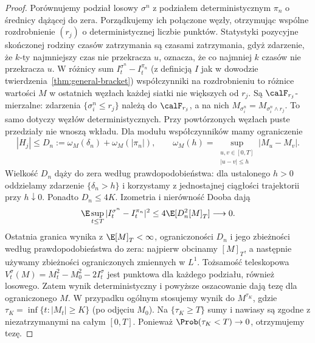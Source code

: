 \begin{proof}
Porównujemy podział losowy $\sigma^n$ z podziałem
deterministycznym $\pi_n$ o średnicy dążącej do zera.
Porządkujemy ich połączone węzły, otrzymując
wspólne rozdrobnienie $(r_j)$ o deterministycznej
liczbie punktów. Statystyki pozycyjne skończonej
rodziny czasów zatrzymania są czasami zatrzymania,
gdyż zdarzenie, że $k$-ty najmniejszy czas nie
przekracza $u$, oznacza, że co najmniej $k$
czasów nie przekracza $u$.
W różnicy sum
$I_t^{\sigma^n}-I_t^{\pi_n}$ (z definicją $I$
jak w dowodzie twierdzenia~\ref{thm:general-bracket})
współczynniki na rozdrobnieniu to różnice
wartości $M$ w ostatnich węzłach każdej siatki
nie większych od $r_j$.
Są $\calF_{r_j}$-mierzalne: zdarzenia
$\{\sigma_i^n\le r_j\}$ należą do $\calF_{r_j}$,
a na nich $M_{\sigma_i^n}=M_{\sigma_i^n\wedge r_j}$.
To samo dotyczy węzłów deterministycznych.
Przy powtórzonych węzłach puste przedziały
nie wnoszą wkładu.
Dla modułu współczynników mamy ograniczenie
\[
|H_j|\le D_n:=\omega_M(\delta_n)+\omega_M(|\pi_n|),
\qquad
\omega_M(h)=\sup_{\substack{u,v\in[0,T]\\|u-v|\le h}}
|M_u-M_v|.
\]
Wielkość $D_n$ dąży do zera według
prawdopodobieństwa: dla ustalonego $h>0$
oddzielamy zdarzenie $\{\delta_n>h\}$ i korzystamy
z jednostajnej ciągłości trajektorii przy $h\downarrow0$.
Ponadto $D_n\le4K$.
Izometria i nierówność Dooba dają
\[
\E\sup_{t\le T}|I_t^{\sigma^n}-I_t^{\pi_n}|^2
\le4\E[D_n^2[M]_T]\longrightarrow0.
\]
Ostatnia granica wynika z $\E[M]_T<\infty$,
ograniczoności $D_n$ i jego zbieżności według
prawdopodobieństwa do zera: najpierw obcinamy
$[M]_T$, a następnie używamy zbieżności
ograniczonych zmiennych w $L^1$.
Tożsamość teleskopowa
$V_t^\sigma(M)=M_t^2-M_0^2-2I_t^\sigma$
jest punktowa dla każdego podziału, również losowego.
Zatem wynik deterministyczny i powyższe
oszacowanie dają tezę dla ograniczonego $M$.
W przypadku ogólnym stosujemy wynik do
$M^{\tau_K}$, gdzie $\tau_K=\inf\{t:|M_t|\ge K\}$
(po odjęciu $M_0$). Na $\{\tau_K\ge T\}$
sumy i nawiasy są zgodne z niezatrzymanymi
na całym $[0,T]$. Ponieważ
$\Prob(\tau_K<T)\to0$, otrzymujemy tezę.
\end{proof}


